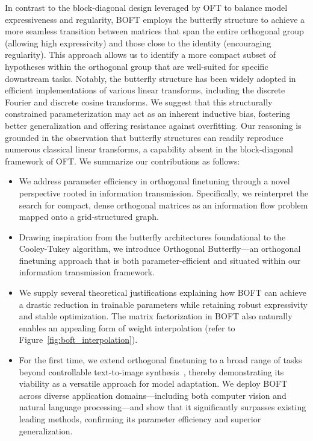 In contrast to the block-diagonal design leveraged by OFT to balance model expressiveness and regularity, BOFT employs the butterfly structure to achieve a more seamless transition between matrices that span the entire orthogonal group (allowing high expressivity) and those close to the identity (encouraging regularity). This approach allows us to identify a more compact subset of hypotheses within the orthogonal group that are well-suited for specific downstream tasks. Notably, the butterfly structure has been widely adopted in efficient implementations of various linear transforms, including the discrete Fourier and discrete cosine transforms. We suggest that this structurally constrained parameterization may act as an inherent inductive bias, fostering better generalization and offering resistance against overfitting. Our reasoning is grounded in the observation that butterfly structures can readily reproduce numerous classical linear transforms, a capability absent in the block-diagonal framework of OFT. We summarize our contributions as follows:

\begin{itemize}[leftmargin=*,nosep]
    \item We address parameter efficiency in orthogonal finetuning through a novel perspective rooted in information transmission. Specifically, we reinterpret the search for compact, dense orthogonal matrices as an information flow problem mapped onto a grid-structured graph.
    \item Drawing inspiration from the butterfly architectures foundational to the Cooley-Tukey algorithm, we introduce Orthogonal Butterfly—an orthogonal finetuning approach that is both parameter-efficient and situated within our information transmission framework.
    \item We supply several theoretical justifications explaining how BOFT can achieve a drastic reduction in trainable parameters while retaining robust expressivity and stable optimization. The matrix factorization in BOFT also naturally enables an appealing form of weight interpolation (refer to Figure~\ref{fig:boft_interpolation}).
    \item For the first time, we extend orthogonal finetuning to a broad range of tasks beyond controllable text-to-image synthesis~\cite{qiu2023controlling}, thereby demonstrating its viability as a versatile approach for model adaptation. We deploy BOFT across diverse application domains—including both computer vision and natural language processing—and show that it significantly surpasses existing leading methods, confirming its parameter efficiency and superior generalization.
\end{itemize}

